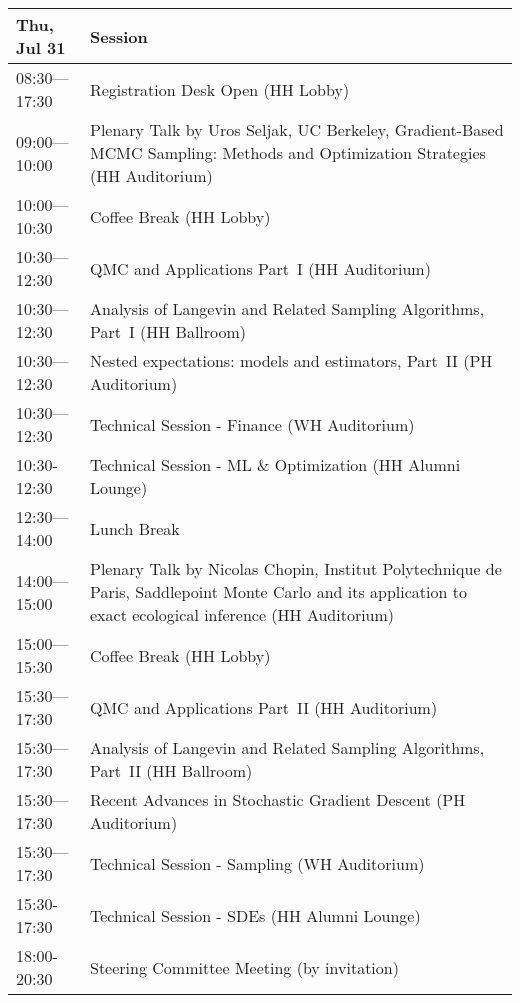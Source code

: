 \begin{table}
{\footnotesize
\begin{tabularx}{\textwidth}{>{\hsize=0.32\hsize}X|>{\hsize=1.7\hsize}X}
\hline
\textbf{Thu, Jul 31} & \textbf{Session} \\
\hline
\cellcolor{\EmptyColor}08:30---17:30 & \cellcolor{\EmptyColor}Registration Desk Open (HH Lobby) \\
\cellcolor{\PlenaryColor}09:00---10:00 & \cellcolor{\PlenaryColor}Plenary Talk by Uros Seljak, UC Berkeley, Gradient-Based MCMC Sampling: Methods and Optimization Strategies (HH Auditorium) \\
\cellcolor{\EmptyColor}10:00---10:30 & \cellcolor{\EmptyColor}Coffee Break (HH Lobby) \\
\cellcolor{\SessionTitleColor}10:30---12:30 & \cellcolor{\SessionTitleColor}QMC and Applications Part~I (HH Auditorium) \\
\cellcolor{\SessionTitleColor}10:30---12:30 & \cellcolor{\SessionTitleColor}Analysis of Langevin and Related Sampling Algorithms, Part~I (HH Ballroom) \\
\cellcolor{\SessionTitleColor}10:30---12:30 & \cellcolor{\SessionTitleColor}Nested expectations: models and estimators, Part~II (PH Auditorium) \\
\cellcolor{\SessionLightColor}10:30---12:30 & \cellcolor{\SessionLightColor}Technical Session - Finance (WH Auditorium) \\
\cellcolor{\SessionLightColor}10:30-12:30 & \cellcolor{\SessionLightColor}Technical Session - ML \& Optimization (HH Alumni Lounge) \\
\cellcolor{\EmptyColor}12:30---14:00 & \cellcolor{\EmptyColor}Lunch Break \\
\cellcolor{\PlenaryColor}14:00---15:00 & \cellcolor{\PlenaryColor}Plenary Talk by Nicolas Chopin, Institut Polytechnique de Paris, Saddlepoint Monte Carlo and its application to exact ecological inference (HH Auditorium) \\
\cellcolor{\EmptyColor}15:00---15:30 & \cellcolor{\EmptyColor}Coffee Break (HH Lobby) \\
\cellcolor{\SessionTitleColor}15:30---17:30 & \cellcolor{\SessionTitleColor}QMC and Applications Part~II (HH Auditorium) \\
\cellcolor{\SessionTitleColor}15:30---17:30 & \cellcolor{\SessionTitleColor}Analysis of Langevin and Related Sampling Algorithms, Part~II (HH Ballroom) \\
\cellcolor{\SessionTitleColor}15:30---17:30 & \cellcolor{\SessionTitleColor}Recent Advances in Stochastic Gradient Descent (PH Auditorium) \\
\cellcolor{\SessionLightColor}15:30---17:30 & \cellcolor{\SessionLightColor}Technical Session - Sampling (WH Auditorium) \\
\cellcolor{\SessionLightColor}15:30-17:30 & \cellcolor{\SessionLightColor}Technical Session - SDEs (HH Alumni Lounge) \\
\cellcolor{\SessionTitleColor}18:00-20:30 & \cellcolor{\SessionTitleColor}Steering Committee Meeting (by invitation) \\
\hline
\end{tabularx}
}
\end{table}

